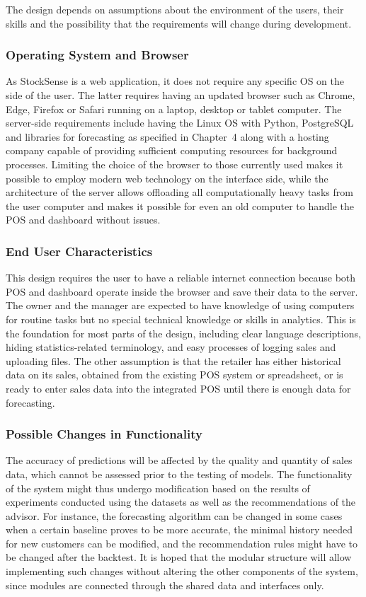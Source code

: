 \documentclass{StockSense}
\begin{document}
The design depends on assumptions about the environment of the users, their skills and the possibility that the requirements will change during development.

\subsubsection{Operating System and Browser}

As StockSense is a web application, it does not require any specific OS on the side of the user. The latter requires having an updated browser such as Chrome, Edge, Firefox or Safari running on a laptop, desktop or tablet computer. The server-side requirements include having the Linux OS with Python, PostgreSQL and libraries for forecasting as specified in Chapter~4 along with a hosting company capable of providing sufficient computing resources for background processes. Limiting the choice of the browser to those currently used makes it possible to employ modern web technology on the interface side, while the architecture of the server allows offloading all computationally heavy tasks from the user computer and makes it possible for even an old computer to handle the POS and dashboard without issues.

\subsubsection{End User Characteristics}

This design requires the user to have a reliable internet connection because both POS and dashboard operate inside the browser and save their data to the server. The owner and the manager are expected to have knowledge of using computers for routine tasks but no special technical knowledge or skills in analytics. This is the foundation for most parts of the design, including clear language descriptions, hiding statistics-related terminology, and easy processes of logging sales and uploading files. The other assumption is that the retailer has either historical data on its sales, obtained from the existing POS system or spreadsheet, or is ready to enter sales data into the integrated POS until there is enough data for forecasting.

\subsubsection{Possible Changes in Functionality}

The accuracy of predictions will be affected by the quality and quantity of sales data, which cannot be assessed prior to the testing of models. The functionality of the system might thus undergo modification based on the results of experiments conducted using the datasets as well as the recommendations of the advisor. For instance, the forecasting algorithm can be changed in some cases when a certain baseline proves to be more accurate, the minimal history needed for new customers can be modified, and the recommendation rules might have to be changed after the backtest. It is hoped that the modular structure will allow implementing such changes without altering the other components of the system, since modules are connected through the shared data and interfaces only.
\end{document}
